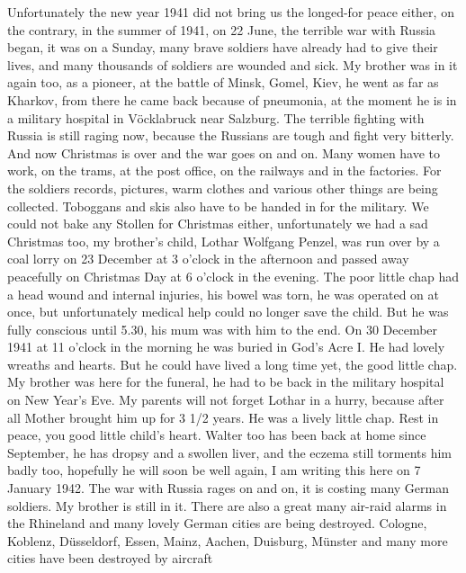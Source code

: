 \documentclass[a5paper,11pt,openany]{book}
\newcommand{\seite}[1]{\leavevmode\marginpar{\footnotesize\itshape\raggedright #1}\ignorespaces}
\begin{document}
\seite{51}
Unfortunately the new year 1941 did not bring us the longed-for peace either,
  on the contrary, in the summer of 1941, on 22 June, the terrible war with Russia began,
  it was on a Sunday, many brave soldiers have already had to give their lives,
  and many thousands of soldiers are wounded and sick.
My brother was in it again too, as a pioneer, at the battle of Minsk,
  Gomel, Kiev, he went as far as Kharkov, from there he
\seite{52}
came back because of pneumonia,
  at the moment he is in a military hospital in Vöcklabruck near Salzburg.
The terrible fighting with Russia is still raging now, because the Russians are tough and fight very bitterly.
And now Christmas is over and the war goes on and on.
Many women have to work, on the trams, at the post office, on the railways and in the factories.
For the soldiers records, pictures, warm clothes and
\seite{53}
various other things are being collected.
Toboggans and skis also have to be handed in for the military.
We could not bake any Stollen for Christmas either,
  unfortunately we had a sad Christmas too, my brother's child,
  Lothar Wolfgang Penzel, was run over by a coal lorry on 23 December at 3 o'clock in the afternoon
  and passed away peacefully on Christmas Day at 6 o'clock in the evening.
The poor little chap had a head wound and internal injuries, his bowel was torn, he was
\seite{54}
operated on at once, but unfortunately medical help could no longer save the child.
But he was fully conscious until 5.30, his mum was with him to the end.
On 30 December 1941 at 11 o'clock in the morning he was buried in God's Acre I.
He had lovely wreaths and hearts.
But he could have lived a long time yet, the good little chap.
My brother was here for the funeral, he had to be back in the military hospital on New Year's Eve.
My parents will not forget Lothar in a hurry,
\seite{55}
because after all Mother brought him up for 3 1/2 years.
He was a lively little chap.
Rest in peace, you good little child's heart.
Walter too has been back at home since September,
  he has dropsy and a swollen liver, and the eczema still torments him badly too, hopefully he will soon be well again,
  I am writing this here on 7 January 1942.
The war with Russia rages on and on, it is costing many German soldiers.
My brother is still in it.
There are also a great many air-raid alarms in the Rhineland
\seite{56}
and many lovely German cities are being destroyed.
Cologne, Koblenz, Düsseldorf, Essen, Mainz, Aachen, Duisburg, Münster and many more cities have been destroyed by aircraft
\end{document}
